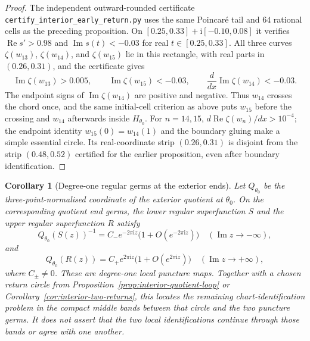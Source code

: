 \documentclass[11pt]{amsart}
\newtheorem{corollary}[theorem]{Corollary}
\theoremstyle{definition}
\newcommand{\Rr}{R}
\newcommand{\ii}{\mathrm{i}}
\begin{document}
\begin{proof}
The independent outward-rounded certificate
\texttt{certify\_interior\_early\_return.py} uses the same Poincar\'e
tail and $64$ rational cells as the preceding proposition.  On
$[0.25,0.33]+\ii[-0.10,0.08]$ it verifies
$\operatorname{Re}s'>0.98$ and
$\operatorname{Im}s(t)<-0.03$ for real $t\in[0.25,0.33]$.
All three curves $\zeta(w_{13})$, $\zeta(w_{14})$, and
$\zeta(w_{15})$ lie in this rectangle, with real parts in
$(0.26,0.31)$, and the certificate gives
\[
 \operatorname{Im}\zeta(w_{13})>0.005,\qquad
 \operatorname{Im}\zeta(w_{15})<-0.03,\qquad
 \frac{d}{dx}\operatorname{Im}\zeta(w_{14})<-0.03.
\]
The endpoint signs of $\operatorname{Im}\zeta(w_{14})$ are positive
and negative.  Thus $w_{14}$ crosses the chord once, and the same
initial-cell criterion as above puts $w_{15}$ before the crossing
and $w_{14}$ afterwards inside $H_{\theta_0}$.  For $n=14,15$,
$d\operatorname{Re}\zeta(w_n)/dx>10^{-4}$; the endpoint identity
$w_{15}(0)=w_{14}(1)$ and the boundary gluing make a simple
essential circle.  Its real-coordinate strip $(0.26,0.31)$ is
disjoint from the strip $(0.48,0.52)$ certified for the earlier
proposition, even after boundary identification.
\end{proof}

\begin{corollary}[Degree-one regular germs at the exterior ends]
\label{cor:interior-end-germs}
Let $Q_{\theta_0}$ be the three-point-normalised coordinate of the
exterior quotient at $\theta_0$.  On the corresponding quotient end
germs, the lower regular superfunction $S$ and the upper regular
superfunction $\Rr$ satisfy
\[
 Q_{\theta_0}(S(z))^{-1}
   =C_-e^{-2\pi\ii z}
       \bigl(1+O(e^{-2\pi\ii z})\bigr)
       \quad(\operatorname{Im}z\to-\infty),
\]
and
\[
 Q_{\theta_0}(\Rr(z))
   =C_+e^{2\pi\ii z}
       \bigl(1+O(e^{2\pi\ii z})\bigr)
       \quad(\operatorname{Im}z\to+\infty),
\]
where $C_\pm\ne0$.  These are degree-one local puncture maps.
Together with a chosen return circle from
Proposition~\ref{prop:interior-quotient-loop} or
Corollary~\ref{cor:interior-two-returns}, this locates the remaining
chart-identification problem in the compact middle bands between
that circle and the two puncture germs.
It does not assert that the two local identifications continue
through those bands or agree with one another.
\end{corollary}
\end{document}
